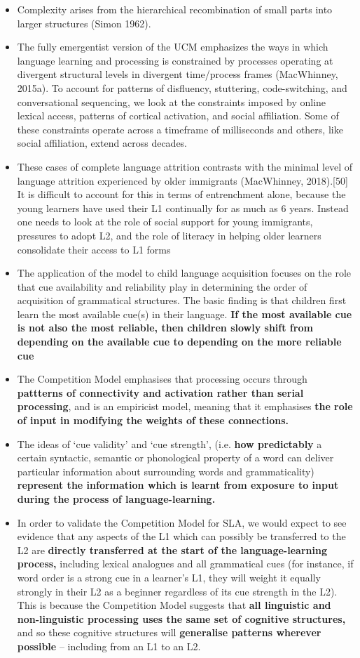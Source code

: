 \documentclass{article}
\begin{document}
\begin{itemize}
    \item Complexity arises from the hierarchical recombination of small parts into larger structures (Simon 1962). 
    \item The fully emergentist version of the UCM emphasizes the ways in which language learning and processing is constrained by processes operating at divergent structural levels in divergent time/process frames (MacWhinney, 2015a). To account for patterns of disfluency, stuttering, code-switching, and conversational sequencing, we look at the constraints imposed by online lexical access, patterns of cortical activation, and social affiliation. Some of these constraints operate across a timeframe of milliseconds and others, like social affiliation, extend across decades.
    \item These cases of complete language attrition contrasts with the minimal level of language attrition experienced by older immigrants (MacWhinney, 2018).[50] It is difficult to account for this in terms of entrenchment alone, because the young learners have used their L1 continually for as much as 6 years. Instead one needs to look at the role of social support for young immigrants, pressures to adopt L2, and the role of literacy in helping older learners consolidate their access to L1 forms
    \item The application of the model to child language acquisition focuses on the role that cue availability and reliability play in determining the order of acquisition of grammatical structures. The basic finding is that children first learn the most available cue(s) in their language. \textbf{If the most available cue is not also the most reliable, then children slowly shift from depending on the available cue to depending on the more reliable cue}
    \item The Competition Model emphasises that processing occurs through \textbf{pattterns of connectivity and activation rather than serial processing}, and is an empiricist model, meaning that it emphasises \textbf{the role of input in modifying the weights of these connections.} 
    \item The ideas of ‘cue validity’ and ‘cue strength’, (i.e. \textbf{how predictably} a certain syntactic, semantic or phonological property of a word can deliver particular information about surrounding words and grammaticality) \textbf{represent the information which is learnt from exposure to input during the process of language-learning.}
    \item In order to validate the Competition Model for SLA, we would expect to see evidence that any aspects of the L1 which can possibly be transferred to the L2 are \textbf{directly transferred at the start of the language-learning process,} including lexical analogues and all grammatical cues (for instance, if word order is a strong cue in a learner’s L1, they will weight it equally strongly in their L2 as a beginner regardless of its cue strength in the L2). This is because the Competition Model suggests that \textbf{all linguistic and non-linguistic processing uses the same set of cognitive structures,} and so these cognitive structures will \textbf{generalise patterns wherever possible} – including from an L1 to an L2. 

\end{itemize}
\end{document}
